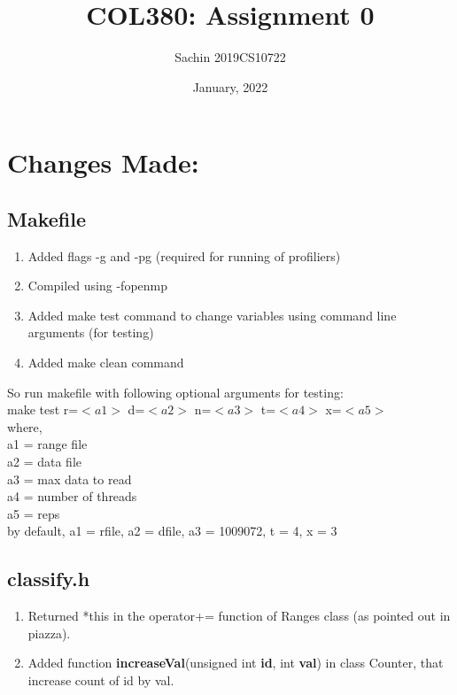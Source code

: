 \documentclass{article}
\title{COL380: Assignment 0}
\author{Sachin 2019CS10722 }
\date{January, 2022}
\begin{document}
\maketitle

\section{Changes Made: }
\subsection{Makefile}
\begin{enumerate}
\item Added flags -g and -pg (required for running of profiliers)
\item Compiled using -fopenmp
\item Added make test command to change variables using command line arguments (for testing)
\item Added make clean command

\end{enumerate}
So run makefile with following optional arguments for testing: \\
\hspace*{1cm} make test r=$<a1>$ d=$<a2>$ n=$<a3>$ t=$<a4>$ x=$<a5>$\\
where, \\
\hspace*{1cm} a1 = range file\\
\hspace*{1cm} a2 = data file\\
\hspace*{1cm} a3 = max data to read\\
\hspace*{1cm} a4 = number of threads\\
\hspace*{1cm} a5 = reps\\

by default, a1 = rfile, a2 = dfile, a3 = 1009072, t = 4, x = 3\\

\subsection{classify.h}
\begin{enumerate}
\item Returned *this in the operator+= function of Ranges class (as pointed out in piazza).
\item Added function \textbf{increaseVal}(unsigned int \textbf{id}, int \textbf{val}) in class Counter, that increase count of id by val.
\end{enumerate}
\end{document}
